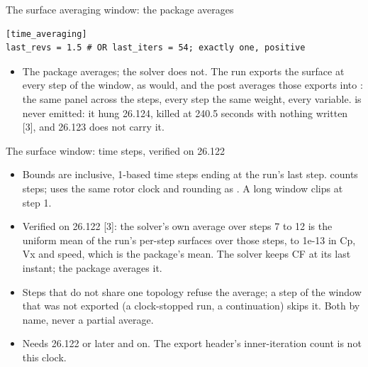 \begin{frame}[fragile]{The surface averaging window: the package averages}
\begin{lstlisting}[style=ftsbase]
[time_averaging]
last_revs = 1.5 # OR last_iters = 54; exactly one, positive
\end{lstlisting}
\begin{itemize}\small
  \item \alert{The package averages; the solver does not.} The run
        exports the surface at every step of the window, as
         would, and the post
        averages those exports into :
        the same panel across the steps, every step the same weight, every
        variable.  is never emitted: it hung
        26.124, killed at 240.5 seconds with nothing written [3], and 26.123
        does not carry it.
\end{itemize}
\end{frame}

\begin{frame}{The surface window: time steps, verified on 26.122}
\begin{itemize}\small
  \item Bounds are inclusive, 1-based time steps ending at the run's last step.
         counts steps;  uses the same rotor
        clock and rounding as . A long window clips at step 1.
  \item Verified on 26.122 [3]: the solver's own average over steps
        7 to 12 is the uniform mean of the run's per-step surfaces over those
        steps, to 1e-13 in Cp, Vx and speed, which is the package's mean. The
        solver keeps CF at its last instant; the package averages it.
  \item Steps that do not share one topology refuse the average; a step of the
        window that was not exported (a clock-stopped run, a continuation) skips
        it. Both by name, never a partial average.
  \item Needs 26.122 or later and  on. The export header's
        inner-iteration count is not this clock.
\end{itemize}
\end{frame}


